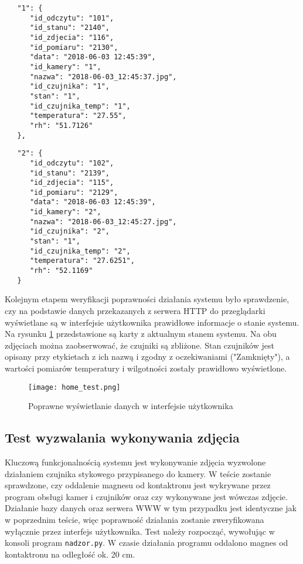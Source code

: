 \documentclass[a4paper,11pt,twoside]{article}
\begin{document}
\begin{minipage}{.5\textwidth}
\begin{lstlisting}
   "1": {
      "id_odczytu": "101",
      "id_stanu": "2140",
      "id_zdjecia": "116",
      "id_pomiaru": "2130",
      "data": "2018-06-03 12:45:39",
      "id_kamery": "1",
      "nazwa": "2018-06-03_12:45:37.jpg",
      "id_czujnika": "1",
      "stan": "1",
      "id_czujnika_temp": "1",
      "temperatura": "27.55",
      "rh": "51.7126"
   },
\end{lstlisting}
\end{minipage}\hfill
\begin{minipage}{.5\textwidth}
\begin{lstlisting}
   "2": {
      "id_odczytu": "102",
      "id_stanu": "2139",
      "id_zdjecia": "115",
      "id_pomiaru": "2129",
      "data": "2018-06-03 12:45:39",
      "id_kamery": "2",
      "nazwa": "2018-06-03_12:45:27.jpg",
      "id_czujnika": "2",
      "stan": "1",
      "id_czujnika_temp": "2",
      "temperatura": "27.6251",
      "rh": "52.1169"
   }
\end{lstlisting}
\end{minipage}

Kolejnym etapem weryfikacji poprawności działania systemu było sprawdzenie, czy na podstawie danych przekazanych z serwera HTTP do przeglądarki wyświetlane są w interfejsie użytkownika prawidłowe informacje o stanie systemu. Na rysunku \ref{fig: home_test} przedstawione są karty z aktualnym stanem systemu. Na obu zdjęciach można zaobserwować, że czujniki są zbliżone. Stan czujników jest opisany przy etykietach z ich nazwą i zgodny z oczekiwaniami ("Zamknięty"), a wartości pomiarów temperatury i wilgotności zostały prawidłowo wyświetlone.

\begin{figure}
\begin{center}
\texttt{[image: home\_test.png]}
\caption{Poprawne wyświetlanie danych w interfejsie użytkownika}
\label{fig: home_test}
\end{center}
\end{figure}

\subsection{Test wyzwalania wykonywania zdjęcia}
Kluczową funkcjonalnością systemu jest wykonywanie zdjęcia wyzwolone działaniem czujnika stykowego przypisanego do kamery. W teście zostanie sprawdzone, czy oddalenie magnesu od kontaktronu jest wykrywane przez program obsługi kamer i czujników oraz czy wykonywane jest wówczas zdjęcie. Działanie bazy danych oraz serwera WWW w tym przypadku jest identyczne jak w poprzednim teście, więc poprawność działania zostanie zweryfikowana wyłącznie przez interfejs użytkownika. Test należy rozpocząć, wywołując w konsoli program \texttt{nadzor.py}. W czasie działania programu oddalono magnes od kontaktronu na odległość ok. 20 cm.
\end{document}
